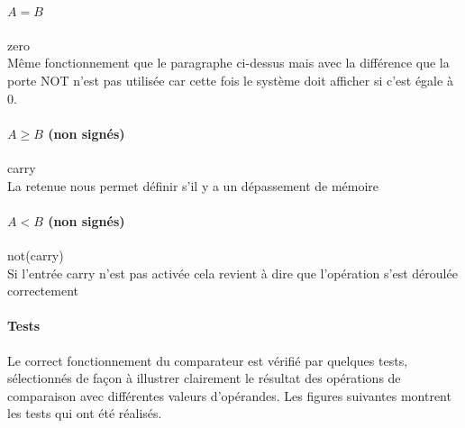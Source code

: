 \documentclass[a4paper]{article}
\begin{document}
\begin{tcolorbox}[colframe=Monokaimagenta,colback=white]
\paragraph{$A=B$} zero\\
Même fonctionnement que le paragraphe ci-dessus mais avec la différence que la porte NOT n'est pas utilisée car cette fois le système doit afficher si c'est égale à 0.

\paragraph{$A \ge B$ (non signés)} carry\\
La retenue nous permet définir s'il y a un dépassement de mémoire

\paragraph{$A < B$ (non signés)} not(carry)\\
Si l'entrée carry n'est pas activée cela revient à dire que l'opération s'est déroulée correctement


\end{tcolorbox}

\paragraph{Tests}
Le correct fonctionnement du comparateur est vérifié par quelques tests, sélectionnés de façon à illustrer clairement le résultat des opérations de comparaison avec différentes valeurs d’opérandes. Les figures suivantes montrent les tests qui ont été réalisés.
\end{document}
